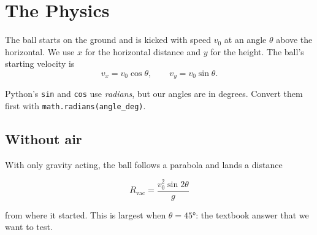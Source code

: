 \documentclass[11pt,a4paper]{article}
\newcommand{\code}[1]{\texttt{\color{codetext}#1}}
\newcounter{task}
\begin{document}
\begin{center}
\end{center}

\section{The Physics}
The ball starts on the ground and is kicked with speed $v_0$ at an angle $\theta$ above the horizontal. We use $x$ for the horizontal distance and $y$ for the height. The ball's starting velocity is
\begin{equation}
  v_x = v_0\cos\theta, \qquad v_y = v_0\sin\theta .
  \label{eq:initial}
\end{equation}

\begin{warning}
Python's \code{sin} and \code{cos} use \emph{radians}, but our angles are in degrees. Convert them first with \code{math.radians(angle\_deg)}.
\end{warning}

\subsection{Without air}
With only gravity acting, the ball follows a parabola and lands a distance
\begin{keyeq}
\vspace{-0.6em}
\begin{equation}
  R_\text{vac} = \frac{v_0^2 \sin 2\theta}{g}
  \label{eq:vac-range}
\end{equation}
\end{keyeq}
from where it started. This is largest when $\theta = \ang{45}$: the textbook answer that we want to test.
\end{document}
